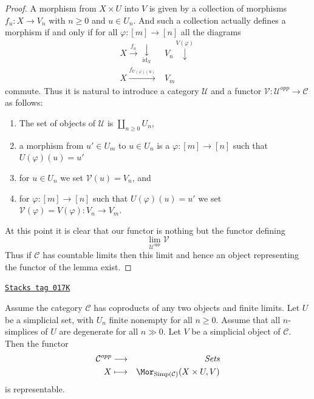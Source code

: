 \begin{proof}
A morphism from $X \times U$ into $V$ is given by a collection
of morphisms $f_u : X \to V_n$ with $n \geq 0$ and $u \in U_n$.
And such a collection actually defines a morphism if and only
if for all $\varphi : [m] \to [n]$ all the diagrams
$$
\begin{array}{cc}X \overset{f_u}{\longrightarrow}\underset{\text{id}_X}{\downarrow} & V_n \overset{V(\varphi)}{\downarrow} \\ X \overset{f_{U(\varphi)(u)}}{\longrightarrow} & V_m\end{array}
$$
commute. Thus it is natural to introduce a category
$\mathcal{U}$ and a functor
$\mathcal{V} : \mathcal{U}^{opp} \to \mathcal{C}$
as follows:
\begin{enumerate}
\item The set of objects of $\mathcal{U}$ is
$\coprod_{n \geq 0} U_n$,
\item a morphism from $u' \in U_m$ to $u \in U_n$
is a $\varphi : [m] \to [n]$ such that $U(\varphi)(u) = u'$
\item for $u \in U_n$ we set $\mathcal{V}(u) = V_n$, and
\item for $\varphi : [m] \to [n]$ such that $U(\varphi)(u) = u'$
we set $\mathcal{V}(\varphi) = V(\varphi) : V_n \to V_m$.
\end{enumerate}
At this point it is clear that our functor is nothing but the
functor defining
$$
\lim_{\mathcal{U}^{opp}} \mathcal{V}
$$
Thus if $\mathcal{C}$ has countable limits then this limit
and hence an object representing the functor of the lemma
exist.
\end{proof}

\begin{lemma}
\label{simplicial-lemma-exists-hom-0-from-simplicial-set-finite}
\href{https://stacks.math.columbia.edu/tag/017K}{\texttt{Stacks tag 017K}}

Assume the category $\mathcal{C}$
has coproducts of any two objects and finite
limits. Let $U$ be a simplicial set, with $U_n$ finite nonempty
for all $n \geq 0$. Assume that all $n$-simplices
of $U$ are degenerate for all $n \gg 0$.
Let $V$ be a simplicial object of $\mathcal{C}$.
Then the functor
\begin{eqnarray*}
\mathcal{C}^{opp} & \longrightarrow & \textit{Sets} \\
X
& \longmapsto &
\Mor_{\text{Simp}(\mathcal{C})}(X \times U, V)
\end{eqnarray*}
is representable.
\end{lemma}

